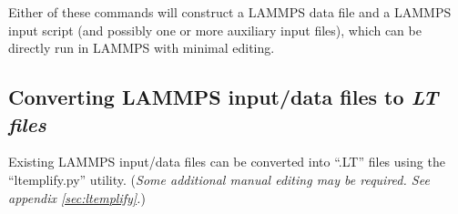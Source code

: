 \documentclass[11pt]{article}
\begin{document}
Either of these commands will construct a LAMMPS data file and a 
LAMMPS input script (and possibly one or more auxiliary input files),
which can be directly run in LAMMPS with minimal editing.


\subsection{Converting LAMMPS input/data files to \textit{LT files}}
Existing LAMMPS input/data files can be converted into 
``.LT'' files using the ``ltemplify.py'' utility. 
(\textit{Some additional manual editing may be required. 
 See appendix \ref{sec:ltemplify}.})


%

\end{document}
